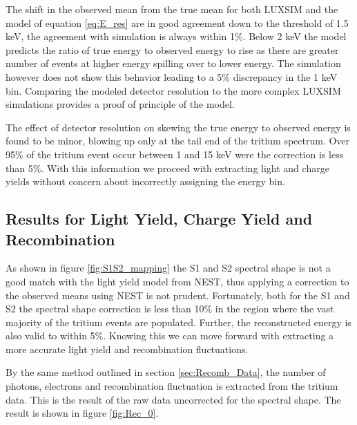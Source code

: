 The shift in the observed mean from the true mean for both LUXSIM and the model of equation \ref{eq:E_res} are in good agreement down to the threshold of 1.5 keV, the agreement with simulation is always within 1\%. Below 2 keV the model predicts the ratio of true energy to observed energy to rise as there are greater number of events at higher energy spilling over to lower energy. The simulation however does not show this behavior leading to a 5\% discrepancy in the 1 keV bin. Comparing the modeled detector resolution to the more complex LUXSIM simulations provides a proof of principle of the model.

The effect of detector resolution on skewing the true energy to observed energy is found to be minor, blowing up only at the tail end of the tritium spectrum. Over 95\% of the tritium event occur between 1 and 15 keV were the correction is less than 5\%. With this information we proceed with extracting light and charge yields without concern about incorrectly assigning the energy bin.


\subsection{Results for Light Yield, Charge Yield and Recombination}

As shown in figure \ref{fig:S1S2_mapping} the S1 and S2 spectral shape is not a good match with the light yield model from NEST, thus applying a correction to the observed means using NEST is not prudent. Fortunately, both for the S1 and S2 the spectral shape correction is less than 10\% in the region where the vast majority of the tritium events are populated. Further, the reconstructed energy is also valid to within 5\%. Knowing this we can move forward with extracting a more accurate light yield and recombination fluctuations. %


By the same method outlined in section \ref{sec:Recomb_Data}, the number of photons, electrons and recombination fluctuation is extracted from the tritium data. This is the result of the raw data uncorrected for the spectral shape. The result is shown in figure \ref{fig:Rec_0}.

